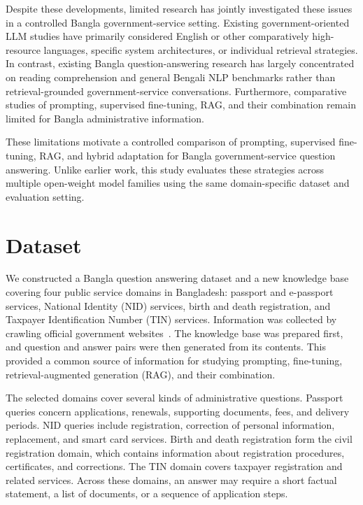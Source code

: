 \documentclass[10pt,journal,compsoc]{IEEEtran}
\begin{document}
Despite these developments, limited research has jointly investigated these issues in a controlled Bangla government-service setting. Existing government-oriented LLM studies have primarily considered English or other comparatively high-resource languages, specific system architectures, or individual retrieval strategies. In contrast, existing Bangla question-answering research has largely concentrated on reading comprehension and general Bengali NLP benchmarks rather than retrieval-grounded government-service conversations. Furthermore, comparative studies of prompting, supervised fine-tuning, RAG, and their combination remain limited for Bangla administrative information.

These limitations motivate a controlled comparison of prompting, supervised fine-tuning, RAG, and hybrid adaptation for Bangla government-service question answering. Unlike earlier work, this study evaluates these strategies across multiple open-weight model families using the same domain-specific dataset and evaluation setting.
\section{Dataset}
\label{sec:dataset}
\label{sec:Dataset and Knowledge Base}

We constructed a Bangla question answering dataset and a new knowledge base covering four public service domains in Bangladesh: passport and e-passport services, National Identity (NID) services, birth and death registration, and Taxpayer Identification Number (TIN) services. Information was collected by crawling official government websites~\cite{gov_epassport,gov_nid,gov_bdris,gov_tin}. The knowledge base was prepared first, and question and answer pairs were then generated from its contents. This provided a common source of information for studying prompting, fine-tuning, retrieval-augmented generation (RAG), and their combination.

The selected domains cover several kinds of administrative questions. Passport queries concern applications, renewals, supporting documents, fees, and delivery periods. NID queries include registration, correction of personal information, replacement, and smart card services. Birth and death registration form the civil registration domain, which contains information about registration procedures, certificates, and corrections. The TIN domain covers taxpayer registration and related services. Across these domains, an answer may require a short factual statement, a list of documents, or a sequence of application steps.
\end{document}
